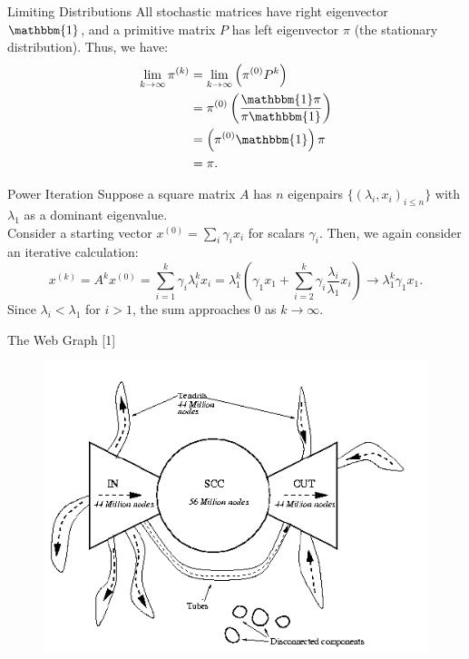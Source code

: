 \documentclass{beamer}
\newcommand{\iter}[2]{#1^{(#2)}}
\newcommand{\iter}[2]{#1^{(#2)}}
\newcommand{\parens}[1]{ \left( #1 \right) }
\begin{document}
\begin{frame}{Limiting Distributions}
    All stochastic matrices have right eigenvector $\mathbbm{1}$, and a primitive matrix $P$ has left eigenvector $\pi$ (the stationary distribution). Thus, we have:
    \begin{align*}
        \lim_{k\to\infty}{{\iter{\pi}{k}}} &= \lim_{k\to\infty}{\parens{{\iter{\pi}{0}} P^k}} \\ &= \iter{\pi}{0} \parens{\frac{\mathbbm{1} \pi}{\pi \mathbbm{1}}} \\ &= \parens{\iter{\pi}{0} \mathbbm{1}} \pi \\ &= \pi. 
    \end{align*}
\end{frame}

\begin{frame}{Power Iteration}
    Suppose a square matrix $A$ has $n$ eigenpairs $\{ (\lambda_i,x_i)_{i\leq n} \}$ with $\lambda_1$ as a dominant eigenvalue.\\
    \vspace{2mm}
    Consider a starting vector $x^{(0)}=\sum_i{\gamma_i x_i}$ for scalars $\gamma_i$. Then, we again consider an iterative calculation:
	\begin{equation*}
		\iter{x}{k} = A^k \iter{x}{0} = \sum_{i=1}^{k}{\gamma_i \lambda_i^k x_i} = \lambda_1^k\parens{\gamma_1 x_1 + \sum_{i=2}^{k}{\gamma_i \frac{\lambda_i}{\lambda_1} x_i}} \to \lambda_1^k \gamma_1 x_1.
	\end{equation*}
	\pause Since $\lambda_i<\lambda_1$ for $i>1$, the sum approaches 0 as $k\to\infty$.
\end{frame}

\begin{frame}{The Web Graph [1]}
        \begin{figure}
        \centering
        \includegraphics[scale=0.6]{../paper/images/bow-tie}
        \label{fig:bow-tie}
    \end{figure}
\end{frame}
\end{document}
